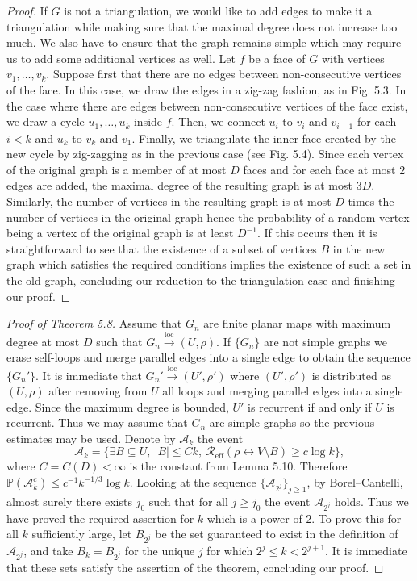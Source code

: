 \documentclass[UTF8,11pt]{ctexart}
\theoremstyle{definition}
\newcommand{\Prob}{\mathbb P}
\newcommand{\Reff}{\mathcal R_{\mathrm{eff}}}
\begin{document}
\begin{proof}
If $G$ is not a triangulation, we would like to add edges to make it a triangulation while making sure that the maximal degree does not increase too much. We also have to ensure that the graph remains simple which may require us to add some additional vertices as well. Let $f$ be a face of $G$ with vertices $v_1,\ldots,v_k$. Suppose first that there are no edges between non-consecutive vertices of the face. In this case, we draw the edges in a zig-zag fashion, as in Fig. 5.3.
In the case where there are edges between non-consecutive vertices of the face exist, we draw a cycle $u_1,\ldots,u_k$ inside $f$. Then, we connect $u_i$ to $v_i$ and $v_{i+1}$ for each $i<k$ and $u_k$ to $v_k$ and $v_1$. Finally, we triangulate the inner face created by the new cycle by zig-zagging as in the previous case (see Fig. 5.4).
Since each vertex of the original graph is a member of at most $D$ faces and for each face at most $2$ edges are added, the maximal degree of the resulting graph is at most $3D$. Similarly, the number of vertices in the resulting graph is at most $D$ times the number of vertices in the original graph hence the probability of a random vertex being a vertex of the original graph is at least $D^{-1}$. If this occurs then it is straightforward to see that the existence of a subset of vertices $B$ in the new graph which satisfies the required conditions implies the existence of such a set in the old graph, concluding our reduction to the triangulation case and finishing our proof.
\end{proof}

\begin{proof}[Proof of Theorem 5.8]
Assume that $G_n$ are finite planar maps with maximum degree at most $D$ such that $G_n\xrightarrow{\mathrm{loc}}(U,\rho)$. If $\{G_n\}$ are not simple graphs we erase self-loops and merge parallel edges into a single edge to obtain the sequence $\{G_n'\}$. It is immediate that $G_n'\xrightarrow{\mathrm{loc}}(U',\rho')$ where $(U',\rho')$ is distributed as $(U,\rho)$ after removing from $U$ all loops and merging parallel edges into a single edge. Since the maximum degree is bounded, $U'$ is recurrent if and only if $U$ is recurrent. Thus we may assume that $G_n$ are simple graphs so the previous estimates may be used.
Denote by $\mathcal A_k$ the event
\[
\mathcal A_k=\{\exists B\subseteq U,\ |B|\le Ck,\ \Reff(\rho\leftrightarrow V\setminus B)\ge c\log k\},
\]
where $C=C(D)<\infty$ is the constant from Lemma 5.10. Therefore $\Prob(\mathcal A_k^c)\le c^{-1}k^{-1/3}\log k$. Looking at the sequence $\{\mathcal A_{2^j}\}_{j\ge1}$, by Borel--Cantelli, almost surely there exists $j_0$ such that for all $j\ge j_0$ the event $\mathcal A_{2^j}$ holds. Thus we have proved the required assertion for $k$ which is a power of $2$.
To prove this for all $k$ sufficiently large, let $B_{2^j}$ be the set guaranteed to exist in the definition of $\mathcal A_{2^j}$, and take $B_k=B_{2^j}$ for the unique $j$ for which $2^j\le k<2^{j+1}$. It is immediate that these sets satisfy the assertion of the theorem, concluding our proof.
\end{proof}
\end{document}
